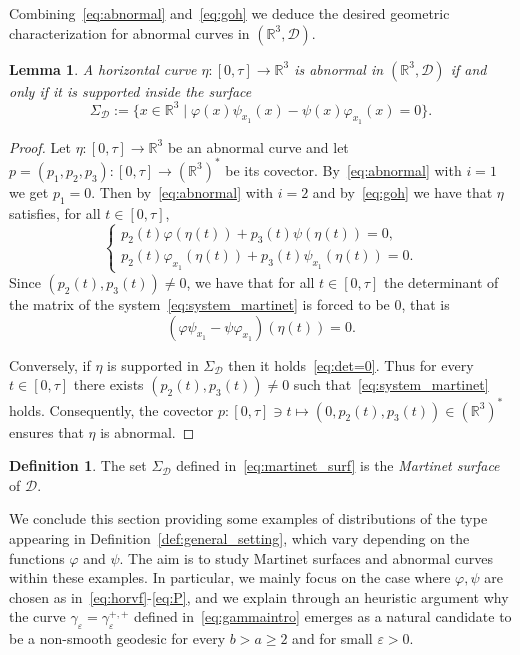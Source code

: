 \documentclass[12pt]{amsart}
\theoremstyle{plain}
\newtheorem {lemma}[theorem]{Lemma}
\theoremstyle{definition}
\newtheorem{definition}[theorem]{Definition}
\theoremstyle{remark}
\numberwithin{equation}{section}
\newcommand{\R}{\mathbb{R}}
\newcommand{\D}{\mathcal{D}}
\newcommand{\<}{\langle}
\renewcommand{\>}{\rangle}
\newcommand{\e}{\varepsilon}
\newcommand{\0}{\theta}
\newcommand{\g}{\gamma}
\newcommand{\1}{{-1}}
\renewcommand{\=}{\coloneqq}
\renewcommand{\.}{\dots}
\renewcommand{\-}{\cdot}
\renewcommand{\:}{\,:\,}
\theoremstyle{definition}
\begin{document}
Combining~\eqref{eq:abnormal} and~\eqref{eq:goh} we deduce the desired geometric characterization for abnormal curves in $(\R^3,\D)$.

\begin{lemma}
	\label{lem:Martinet}
	A horizontal curve $\eta:[0,\tau]\to\R^3$ is abnormal in $(\R^3,\D)$ if and only if it is supported inside the surface
	\begin{equation}
		\label{eq:martinet_surf}
		\Sigma_\D:=\{x\in\R^3\mid \varphi(x)\psi_{x_1}(x)-\psi(x)\varphi_{x_1}(x)=0\}.
	\end{equation}
\end{lemma}

\begin{proof}
Let $\eta:[0,\tau]\to\R^3$ be an abnormal curve and let $p=(p_1,p_2,p_3):[0,\tau]\to(\R^3)^*$ be its covector. By~\eqref{eq:abnormal} with $i=1$ we get $p_1=0$. Then by~\eqref{eq:abnormal} with $i=2$ and by~\eqref{eq:goh} we have that $\eta$ satisfies, for all $t\in[0,\tau]$,
\begin{equation}
	\label{eq:system_martinet}
	\begin{cases}
		p_2(t)\varphi(\eta(t)) + p_3(t)\psi(\eta(t))=0,\\
		p_2(t)\varphi_{x_1}(\eta(t)) + p_3(t)\psi_{x_1}(\eta(t))=0.
	\end{cases}
\end{equation}
Since $(p_2(t),p_3(t))\neq 0$, we have that for all $t\in[0,\tau]$ the determinant of the matrix of the system~\eqref{eq:system_martinet} is forced to be 0, that is
\begin{equation}
	\label{eq:det=0}
	(\varphi\psi_{x_1}-\psi\varphi_{x_1})(\eta(t))=0.
\end{equation}

Conversely, if $\eta$ is supported in $\Sigma_\D$ then it holds~\eqref{eq:det=0}. Thus for every $t\in[0,\tau]$ there exists $(p_2(t),p_3(t))\neq0$ such that~\eqref{eq:system_martinet} holds. Consequently, the covector $p:[0,\tau]\ni t\mapsto(0,p_2(t),p_3(t))\in(\R^3)^*$ ensures that $\eta$ is abnormal.
\end{proof}


\begin{definition}
	The set $\Sigma_\D$ defined in~\eqref{eq:martinet_surf} is the {\em Martinet surface} of $\D$.
\end{definition}




We conclude this section providing some examples of distributions of the type appearing in Definition~\ref{def:general_setting}, which vary depending on the functions $\varphi$ and $\psi$. The aim is to study Martinet surfaces and abnormal curves within these examples. In particular, we mainly focus on the case where $\varphi,\psi$ are chosen as in~\eqref{eq:horvf}-\eqref{eq:P}, and we explain through an heuristic argument why the curve $\g_\e=\g_\e^{+,+}$ defined in~\eqref{eq:gammaintro} emerges as a natural candidate to be a non-smooth geodesic for every $b>a\geq2$ and for small $\e>0$.
\end{document}
